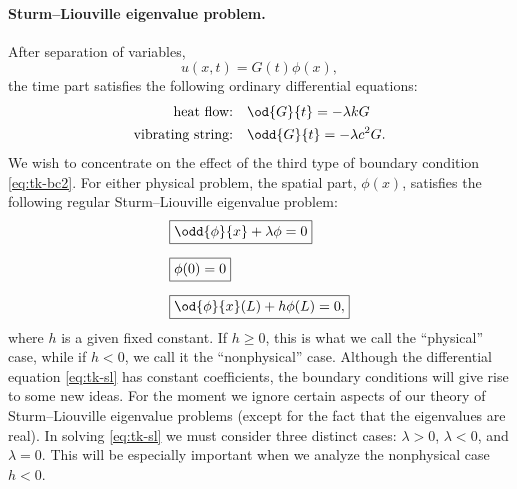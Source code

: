 \paragraph{Sturm--Liouville eigenvalue problem.}
After separation of variables,
\begin{equation}
\label{eq:tk-sep}
u(x,t) = G(t)\phi(x),
\end{equation}
the time part satisfies the following ordinary differential equations:
\begin{align}
\label{eq:tk-time-heat}
\text{heat flow:}\quad & \od{G}{t} = -\lambda kG \\
\label{eq:tk-time-wave}
\text{vibrating string:}\quad & \odd{G}{t} = -\lambda c^2G.
\end{align}
We wish to concentrate on the effect of the third type of boundary condition \eqref{eq:tk-bc2}.  For either physical problem, the spatial part, $\phi(x)$, satisfies the following regular Sturm--Liouville eigenvalue problem:
\begin{align}
\label{eq:tk-sl}
& \boxed{\odd{\phi}{x} + \lambda\phi = 0} \\[6pt]
\label{eq:tk-sl-bc1}
& \boxed{\phi(0) = 0} \\[6pt]
\label{eq:tk-sl-bc2}
& \boxed{\od{\phi}{x}(L) + h\phi(L) = 0,}
\end{align}
where $h$ is a given fixed constant.  If $h \ge 0$, this is what we call the ``physical'' case, while if $h < 0$, we call it the ``nonphysical'' case.  Although the differential equation \eqref{eq:tk-sl} has constant coefficients, the boundary conditions will give rise to some new ideas.  For the moment we ignore certain aspects of our theory of Sturm--Liouville eigenvalue problems (except for the fact that the eigenvalues are real).  In solving \eqref{eq:tk-sl} we must consider three distinct cases: $\lambda > 0$, $\lambda < 0$, and $\lambda = 0$.  This will be especially important when we analyze the nonphysical case $h < 0$.

